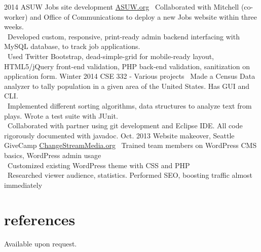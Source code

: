 \documentclass[]{friggeri-cv}
\begin{document}
\begin{entrylist}
  \entry
    {2014}
    {ASUW Jobs site development}
    {\href{http://jobs.asuw.org}{ASUW.org}}
    {\bullet \, Collaborated with Mitchell (co-worker) and Office of Communications to deploy a new Jobs website within three weeks. \\
    \bullet \, Developed custom, responsive, print-ready admin backend interfacing with MySQL database, to track job applications. \\
    \bullet \, Used Twitter Bootstrap, dead-simple-grid for mobile-ready layout, HTML5/jQuery front-end validation, PHP back-end validation, sanitization on application form.
    }
  \entry
    {Winter 2014}
    {CSE 332 - Various projects}
    {}
    {\bullet \, Made a Census Data analyzer to tally population in a given area of the United States. Has GUI and CLI. \\
    \bullet \, Implemented different sorting algorithms, data structures to analyze text from plays. Wrote a test suite with JUnit. \\
    \bullet \, Collaborated with partner using git development and Eclipse IDE. All code rigorously documented with javadoc.}
  \entry
    {Oct. 2013}
    {Website makeover, Seattle GiveCamp}
    {\href{http://changestreammedia.org}{ChangeStreamMedia.org}}
    {\bullet \, Trained team members on WordPress CMS basics, WordPress admin usage \\
    \bullet \, Customized existing WordPress theme with CSS and PHP \\
    \bullet \, Researched viewer audience, statistics. Performed SEO, boosting traffic almost immediately}
\end{entrylist}

\pagebreak

\section{references}

Available upon request.
\end{document}
